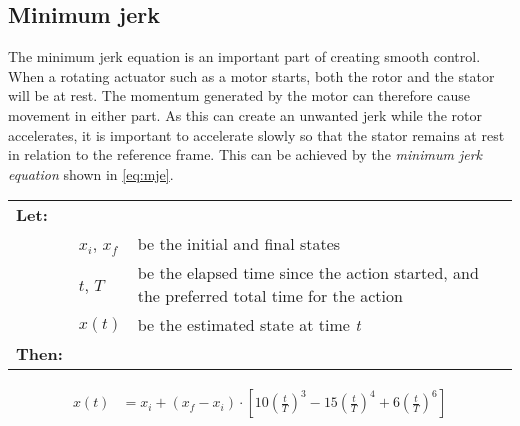 \documentclass[11pt]{article}
\begin{document}
\subsection{Minimum jerk}
The minimum jerk equation is an important part of creating smooth control. When a rotating actuator such as a motor starts, both the rotor and the stator will be at rest. The momentum generated by the motor can therefore cause movement in either part. As this can create an unwanted jerk while the rotor accelerates, it is important to accelerate slowly so that the stator remains at rest in relation to the reference frame. This can be achieved by the \emph{minimum jerk equation} shown in \vref{eq:mje}.
\par \vspace{10pt}
{\footnotesize
  \begin{tabular}{l l l}
    \textbf{Let:} \\
 &$x_i$, $x_f$ &be the initial and final states\\
 &$t$, $T$ &be the elapsed time since the action started, and the preferred total time for the action  \\
 &$x(t)$ &be the estimated state at time \emph{t} \\
    \textbf{Then:}
  \end{tabular}
  \begin{align}
    x(t) &= x_i +  (x_f - x_i) \cdot \left[10\left(\frac{t}{T}\right)^3 - 15\left(\frac{t}{T}\right)^4 + 6\left(\frac{t}{T}\right)^6 \right]\label{eq:mje}          
  \end{align}}
\end{document}
